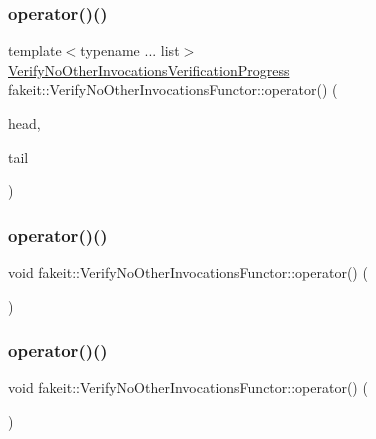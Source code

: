 \subsubsection{\texorpdfstring{operator()()}{operator()()}\hspace{0.1cm}{\footnotesize\ttfamily [10/18]}}
{\footnotesize\ttfamily template$<$typename ... list$>$ \\
\mbox{\hyperlink{classfakeit_1_1VerifyNoOtherInvocationsVerificationProgress}{Verify\+No\+Other\+Invocations\+Verification\+Progress}} fakeit\+::\+Verify\+No\+Other\+Invocations\+Functor\+::operator() (\begin{DoxyParamCaption}\item[{const \mbox{\hyperlink{structfakeit_1_1ActualInvocationsSource}{Actual\+Invocations\+Source}} \&}]{head,  }\item[{const list \&...}]{tail }\end{DoxyParamCaption})\hspace{0.3cm}{\ttfamily [inline]}}

\mbox{\label{classfakeit_1_1VerifyNoOtherInvocationsFunctor_a40fae42fc436deb576fd08482382811a}} 
\subsubsection{\texorpdfstring{operator()()}{operator()()}\hspace{0.1cm}{\footnotesize\ttfamily [11/18]}}
{\footnotesize\ttfamily void fakeit\+::\+Verify\+No\+Other\+Invocations\+Functor\+::operator() (\begin{DoxyParamCaption}{ }\end{DoxyParamCaption})\hspace{0.3cm}{\ttfamily [inline]}}

\mbox{\label{classfakeit_1_1VerifyNoOtherInvocationsFunctor_a40fae42fc436deb576fd08482382811a}} 
\subsubsection{\texorpdfstring{operator()()}{operator()()}\hspace{0.1cm}{\footnotesize\ttfamily [12/18]}}
{\footnotesize\ttfamily void fakeit\+::\+Verify\+No\+Other\+Invocations\+Functor\+::operator() (\begin{DoxyParamCaption}{ }\end{DoxyParamCaption})\hspace{0.3cm}{\ttfamily [inline]}}

